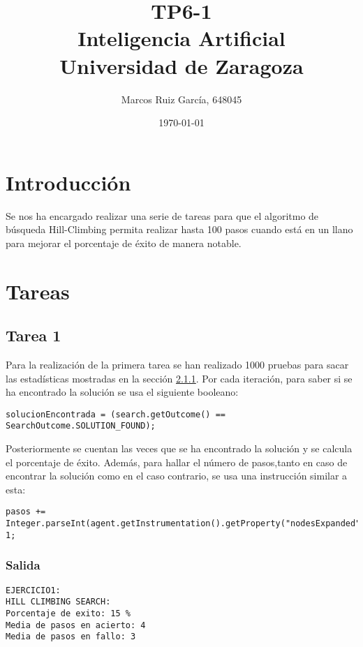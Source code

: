 \documentclass[a4paper]{article}
\title{TP6-1 \\ Inteligencia Artificial \\ \large Universidad de Zaragoza}
\author{Marcos Ruiz García, 648045}
\date{\today}
\begin{document}
\maketitle


\section{Introducción}
Se nos ha encargado realizar una serie de tareas para que el algoritmo de búsqueda Hill-Climbing permita realizar hasta 100 pasos cuando está en un llano para mejorar el porcentaje de éxito de manera notable.

\section{Tareas}

\subsection{Tarea 1}
Para la realización de la primera tarea se han realizado 1000 pruebas para sacar las estadísticas mostradas en la sección \ref{sec:salida1}.
Por cada iteración, para saber si se ha encontrado la solución se usa el siguiente booleano:
\begin{lstlisting}[style=Java]
solucionEncontrada = (search.getOutcome() == SearchOutcome.SOLUTION_FOUND);
\end{lstlisting}
Posteriormente se cuentan las veces que se ha encontrado la solución y se calcula el porcentaje de éxito.
Además, para hallar el número de pasos,tanto en caso de encontrar la solución como en el caso contrario, se usa una instrucción similar a esta:
\begin{lstlisting}[style=Java]
pasos += Integer.parseInt(agent.getInstrumentation().getProperty("nodesExpanded"))- 1;
\end{lstlisting}
\subsubsection{Salida}\label{sec:salida1}
\begin{lstlisting}[style=consola, numbers=none]
EJERCICIO1:
HILL CLIMBING SEARCH:
Porcentaje de exito: 15 %
Media de pasos en acierto: 4
Media de pasos en fallo: 3
\end{lstlisting}
\end{document}

